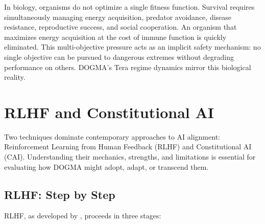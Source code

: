 \begin{bioinsight}
In biology, organisms do not optimize a single fitness function.
Survival requires simultaneously managing energy acquisition, predator avoidance, disease resistance, reproductive success, and social cooperation.
An organism that maximizes energy acquisition at the cost of immune function is quickly eliminated.
This multi-objective pressure acts as an implicit safety mechanism: no single objective can be pursued to dangerous extremes without degrading performance on others.
DOGMA's Tera regime dynamics mirror this biological reality.
\end{bioinsight}

\section{RLHF and Constitutional AI}
\label{sec:rlhf-cai}

Two techniques dominate contemporary approaches to AI alignment: Reinforcement Learning from Human Feedback (RLHF) and Constitutional AI (CAI).
Understanding their mechanics, strengths, and limitations is essential for evaluating how DOGMA might adopt, adapt, or transcend them.

\subsection{RLHF: Step by Step}

RLHF, as developed by \citet{ouyang2022}, proceeds in three stages:

